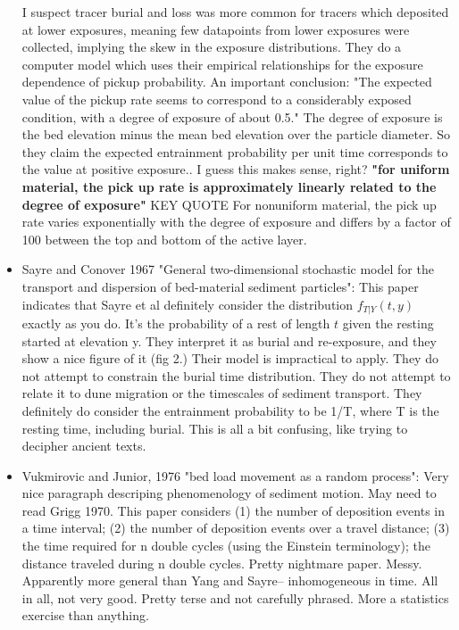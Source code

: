 \documentclass{article}
\begin{document}
\begin{itemize}
I suspect tracer burial and loss was more common for tracers which deposited at lower exposures, meaning few datapoints from lower exposures were collected, implying the skew in the exposure distributions. 
They do a computer model which uses their empirical relationships for the exposure dependence of pickup probability. 
An important conclusion: "The expected value of the pickup rate seems to correspond to a considerably exposed condition, with a degree of exposure of about 0.5."
The degree of exposure is the bed elevation minus the mean bed elevation over the particle diameter. 
So they claim the expected entrainment probability per unit time corresponds to the value at positive exposure.. I guess this makes sense, right? 
\textbf{"for uniform material, the pick up rate is approximately linearly related to the degree of exposure"} KEY QUOTE 
For nonuniform material, the pick up rate varies exponentially with the degree of exposure and differs by a factor of 100 between the top and bottom of the active layer. 


\item Sayre and Conover 1967 "General two-dimensional stochastic model for the transport and dispersion of bed-material sediment particles": 
This paper indicates that Sayre et al definitely consider the distribution $f_{T|Y}(t,y)$ exactly as you do. It's the probability of a rest of length $t$ given the resting started at elevation y. They interpret it as burial and re-exposure, and they show a nice figure of it (fig 2.) Their model is impractical to apply. 
They do not attempt to constrain the burial time distribution. They do not attempt to relate it to dune migration or the timescales of sediment transport. They definitely do consider the entrainment probability to be 1/T, where T is the resting time, including burial. This is all a bit confusing, like trying to decipher ancient texts. 

\item Vukmirovic and Junior, 1976 "bed load movement as a random process": 
Very nice paragraph descriping phenomenology of sediment motion. 
May need to read Grigg 1970. 
This paper considers (1) the number of deposition events in a time interval; (2) the number of deposition events over a travel distance; (3) the time required for n double cycles (using the Einstein terminology); the distance traveled during n double cycles. 
Pretty nightmare paper. Messy. Apparently more general than Yang and Sayre-- inhomogeneous in time.
All in all, not very good. Pretty terse and not carefully phrased. More a statistics exercise than anything. 


\end{itemize}
\end{document}
